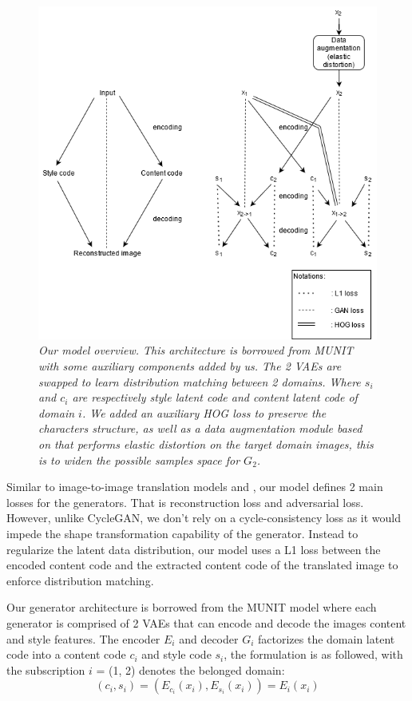 \documentclass[12pt]{report}
\begin{document}
\begin{figure}[H]
	\centering
	\includegraphics[scale=0.7]{model-overview}
	\caption{\textit{Our model overview. This architecture is borrowed from MUNIT\cite{munit} with some auxiliary components added by us. The 2 VAEs are swapped to learn distribution matching between 2 domains. Where $s_i$ and $c_i$ are respectively style latent code and content latent code of domain $i$. We added an auxiliary HOG loss to preserve the characters structure, as well as a data augmentation module based on \cite{augmentor} that performs elastic distortion on the target domain images, this is to widen the possible samples space for $G_2$.}}
	\label{fig:model-overview}
\end{figure}

Similar to image-to-image translation models \cite{cycle-gan}\cite{bicycle-gan}\cite{disco-gan} and \cite{munit}, our model defines 2 main losses for the generators. That is reconstruction loss and adversarial loss. However, unlike CycleGAN, we don't rely on a cycle-consistency loss as it would impede the shape transformation capability of the generator. Instead to regularize the latent data distribution, our model uses a L1 loss between the encoded content code and the extracted content code of the translated image to enforce distribution matching. 

Our generator architecture is borrowed from the MUNIT model \cite{munit} where each generator is comprised of 2 VAEs that can encode and decode the images content and style features. The encoder $E_i$ and decoder $G_i$ factorizes the domain latent code into a content code $c_i$ and style code $s_i$, the formulation is as followed, with the subscription $i$ = (1, 2) denotes the belonged domain:
\[(c_i, s_i) =  (E_{c_i}(x_i), E_{s_i}(x_i)) = E_i(x_i)\]
\end{document}
